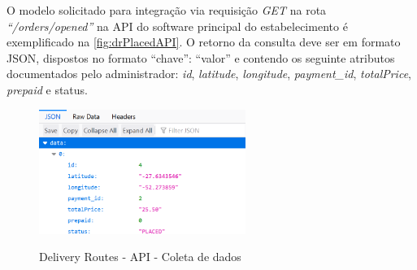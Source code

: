 O modelo solicitado para integração via requisição \textit{GET} na rota \textit{“/orders/opened”} na API do software principal do estabelecimento é exemplificado na \autoref{fig:drPlacedAPI}. O retorno da consulta deve ser em formato JSON, dispostos no formato “chave”: “valor” e contendo os seguinte atributos documentados pelo administrador: \textit{id}, \textit{latitude}, \textit{longitude}, \textit{payment\_id}, \textit{totalPrice}, \textit{prepaid} e status.

\begin{figure}[H]
    \centering
    \caption{Delivery Routes - API - Coleta de dados}
    \includegraphics[width=0.6\textwidth]{./dados/figuras/fig14}
    \label{fig:drPlacedAPI}
\end{figure}